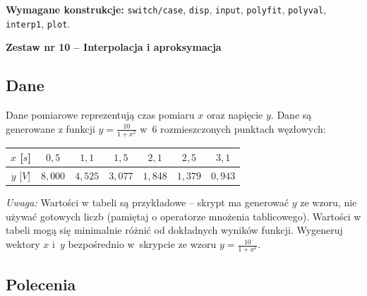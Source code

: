 \documentclass[a4paper,11pt]{article}
\begin{document}
\vspace{0.3cm}
\begin{ramka}
\textbf{Wymagane konstrukcje:}
\texttt{switch/case}, \texttt{disp}, \texttt{input}, \texttt{polyfit}, \texttt{polyval}, \texttt{interp1}, \texttt{plot}.
\end{ramka}

\clearpage
\begin{center}
  {\large\bfseries Zestaw nr 10 \quad -- \quad Interpolacja i aproksymacja}
\end{center}
\hrulefill
\vspace{0.4cm}

\subsection*{Dane}

Dane pomiarowe reprezentują czas pomiaru $x$ oraz napięcie $y$.
Dane są generowane z funkcji $y = \frac{10}{1 + x^2}$ w~6 rozmieszczonych punktach węzłowych:

\begin{center}
\begin{tabular}{c|cccccc}
  \toprule
  $x$ [$s$] & $0{,}5$ & $1{,}1$ & $1{,}5$ & $2{,}1$ & $2{,}5$ & $3{,}1$ \\
  \midrule
  $y$ [$V$] & $8{,}000$ & $4{,}525$ & $3{,}077$ & $1{,}848$ & $1{,}379$ & $0{,}943$ \\
  \bottomrule
\end{tabular}
\end{center}

\medskip
\textit{Uwaga:} Wartości w tabeli są przykładowe – skrypt ma generować $y$ ze wzoru, nie używać gotowych liczb (pamiętaj o operatorze mnożenia tablicowego). Wartości w tabeli mogą się minimalnie różnić od dokładnych wyników funkcji.
Wygeneruj wektory $x$ i~$y$ bezpośrednio w~skrypcie ze wzoru $y = \frac{10}{1 + x^2}$.

\subsection*{Polecenia}
\end{document}
